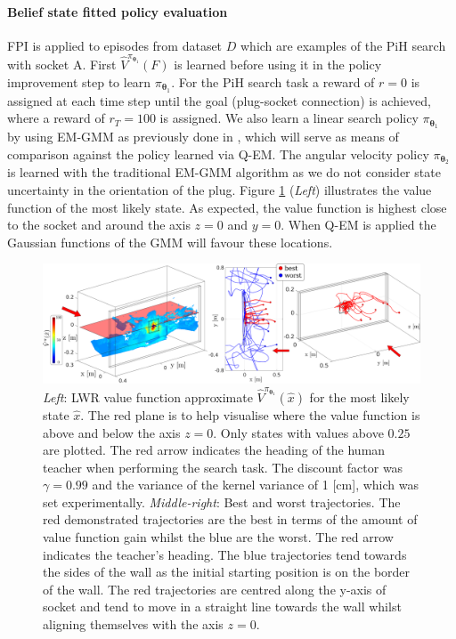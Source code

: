 \documentclass[final,5p,times,twocolumn]{elsarticle}
\newcommand{\Param}{\boldsymbol{\theta}}
\begin{document}
\paragraph{Belief state fitted policy evaluation}

FPI is applied to episodes from dataset $D$ which are examples of the PiH search with socket A. 
First $\hat{V}^{\pi_{\Param_1}}(F)$ is learned before using it in the policy improvement  
step to learn $\pi_{\Param_1}$. For the PiH search task a reward of ${r=0}$ is assigned at each 
time step until the goal (plug-socket connection) is achieved, where a reward of $r_{T}=100$ is assigned.
We also learn a linear search policy $\pi_{\Param_1}$ by using 
EM-GMM as previously done in \cite{Chambrier2014}, which will serve as means of comparison 
against the policy learned via Q-EM.
The angular velocity policy $\pi_{\Param_2}$ is learned with the 
traditional EM-GMM algorithm as we do not consider state uncertainty in the orientation of the plug.
Figure \ref{fig:ch4:Figure1} (\textit{Left}) illustrates the value function of the most likely state. 
As expected, the value function is highest close to the socket and around the axis $z=0$ and $y=0$. When Q-EM 
is applied the Gaussian functions of the GMM will favour these locations. 

\begin{figure}
 \centering
 \includegraphics[width=\linewidth]{./Figure/value_function_belief.pdf}
 \caption{\textit{Left}: LWR value function approximate $\hat{V}^{\pi_{\Param_1}}(\hat{x})$ for the most likely state $\hat{x}$. 
 The red plane is to help visualise where the value function is above and below the axis $z=0$. Only states with values above
 $0.25$ are plotted.  The red arrow indicates the heading of the human teacher when performing the search task. The discount 
 factor was $\gamma=0.99$ and the variance of the kernel variance of 1 [cm], which was set experimentally.
 \textit{Middle-right}: Best and worst trajectories. The red demonstrated trajectories are the best in terms of the amount of value function 
 gain whilst the blue are the worst. The red arrow indicates the teacher's heading. The blue trajectories tend 
 towards the sides of the wall as the initial starting position is on the border of the wall. The red trajectories are centred along the y-axis of socket and tend to move in a straight line towards 
 the wall whilst aligning themselves with the axis $z=0$.
}
 \label{fig:ch4:Figure1}
\end{figure}
\end{document}

